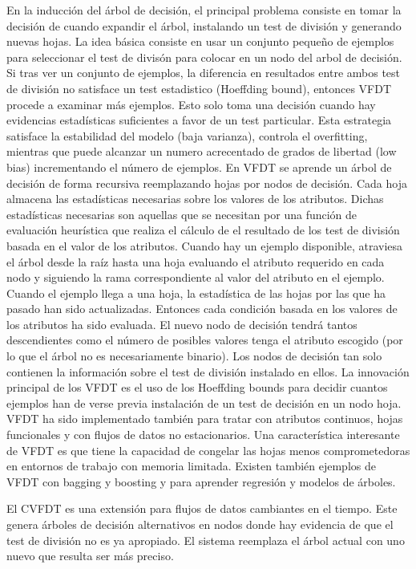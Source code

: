 En la inducción del árbol de decisión, el principal problema consiste en tomar la decisión de cuando expandir el árbol, instalando un test de división y generando nuevas hojas.
La idea básica consiste en usar un conjunto pequeño de ejemplos para seleccionar el test de divisón para colocar en un nodo del arbol de decisión.
Si tras ver un conjunto de ejemplos, la diferencia en resultados entre ambos test de división no satisface un test estadistico (Hoeffding bound), entonces VFDT procede a examinar
más ejemplos.
Esto solo toma una decisión cuando hay evidencias estadísticas suficientes a favor de un test particular.
Esta estrategia satisface la estabilidad del modelo (baja varianza), controla el overfitting, mientras que puede alcanzar un numero acrecentado de grados de libertad (low bias)
incrementando el número de ejemplos.
En VFDT se aprende un árbol de decisión de forma recursiva reemplazando hojas por nodos de decisión. Cada hoja almacena las estadísticas necesarias sobre los valores de los
atributos. Dichas estadísticas necesarias son aquellas que se necesitan por una función de evaluación heurística que realiza el cálculo de el resultado de los test de división 
basada en el valor de los atributos.
Cuando hay un ejemplo disponible, atraviesa el árbol desde la raíz hasta una hoja evaluando el atributo requerido en cada nodo y siguiendo la rama correspondiente al valor
del atributo en el ejemplo.
Cuando el ejemplo llega a una hoja, la estadística de las hojas por las que ha pasado han sido actualizadas.
Entonces cada condición basada en los valores de los atributos ha sido evaluada.
El nuevo nodo de decisión tendrá tantos descendientes como el número de posibles valores tenga el atributo escogido (por lo que el árbol no es necesariamente binario).
Los nodos de decisión tan solo contienen la información sobre el test de división instalado en ellos.
La innovación principal de los VFDT es el uso de los Hoeffding bounds para decidir cuantos ejemplos han de verse previa instalación de un test de decisión en un nodo
hoja.
VFDT ha sido implementado también para tratar con atributos continuos, hojas funcionales y con flujos de datos no estacionarios. 
Una característica interesante de VFDT es que tiene la capacidad de congelar las hojas menos comprometedoras en entornos de trabajo con memoria limitada. Existen  también ejemplos de VFDT con bagging y boosting y para aprender regresión y modelos de árboles.

El CVFDT es una extensión para flujos de datos cambiantes en el tiempo. Este genera árboles de decisión alternativos en nodos donde hay evidencia de que el test de división no
es ya apropiado. El sistema reemplaza el árbol actual con uno nuevo que resulta ser más preciso.


